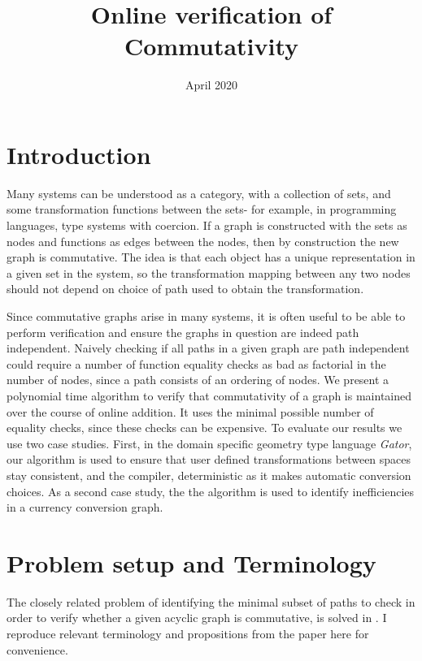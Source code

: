 \documentclass{article}
\title{Online verification of Commutativity}
\author{ }
\date{April 2020}
\begin{document}
\maketitle

\section{Introduction}

Many systems can be understood as a category, with a collection of sets, and some transformation functions between the sets- for example, in programming languages, type systems with coercion. If a graph is constructed with the sets as nodes and functions as edges between the nodes, then by construction the new graph is commutative. The idea is that each object has a unique representation in a given set in the system, so the transformation mapping between any two nodes should not depend on choice of path used to obtain the transformation.

Since commutative graphs arise in many systems, it is often useful to be able to perform verification and ensure the graphs in question are indeed path independent. 
Naively checking if all paths in a given graph are path independent could require a number of function equality checks as bad as factorial in the number of nodes, since a path consists of an ordering of nodes. 
We present a polynomial time algorithm to verify that commutativity of a graph is maintained over the course of online addition. It uses the minimal possible number of equality checks, since these checks can be expensive. 
To evaluate our results we use two case studies.
First, in the domain specific geometry type language \textit{Gator}, our algorithm is used to ensure that user defined transformations between spaces stay consistent, and the compiler, deterministic as it makes automatic conversion choices. As a second case study, the the algorithm is used to identify inefficiencies in a currency conversion graph.

\section{Problem setup and Terminology}
The closely related problem of identifying the minimal subset of paths to check in order to verify whether a given acyclic graph is commutative, is solved in \cite{commutative}. 
I reproduce relevant terminology and propositions from the paper here for convenience.
\end{document}
